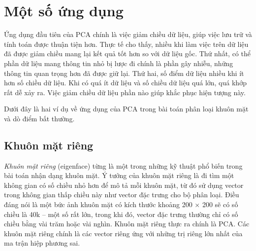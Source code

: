 





\section{Một số ứng dụng}
Ứng dụng đầu tiên của PCA chính là việc giảm chiều dữ liệu, giúp
việc lưu trữ và tính toán được thuận tiện hơn. Thực tế cho thấy, nhiều khi làm
việc trên dữ liệu đã được giảm chiều mang lại kết quả tốt hơn so với dữ liệu
gốc. Thứ nhất, có thể phần dữ liệu mang thông tin nhỏ bị lược đi chính là phần
gây nhiễu, những thông tin quan trọng hơn đã được giữ lại. Thứ hai, số điểm dữ
liệu nhiều khi ít hơn số chiều dữ liệu. Khi có quá ít dữ liệu và số chiều dữ
liệu quá lớn, quá khớp rất dễ xảy ra. Việc giảm chiều dữ liệu phần nào giúp
khắc phục hiện tượng này.

Dưới đây là hai ví dụ về ứng dụng của PCA trong bài toán phân loại khuôn mặt và dò điểm bất thường.

\subsection{Khuôn mặt riêng}
\textit{Khuôn mặt riêng} (eigenface) từng là một trong những kỹ thuật phổ biến
trong bài toán nhận dạng khuôn mặt. Ý tưởng của khuôn mặt riêng là đi tìm một
không gian có số chiều nhỏ hơn để mô tả mỗi khuôn mặt, từ đó sử dụng vector
trong không gian thấp chiều này như vector đặc trưng cho bộ phân loại. Điều đáng
nói là một bức ảnh khuôn mặt có kích thước khoảng 200 $\times$ 200 sẽ có số
chiều là 40k -- một số rất lớn, trong khi đó, vector đặc trưng thường chỉ có số
chiều bằng vài trăm hoặc vài nghìn. Khuôn mặt riêng thực ra chính là PCA. Các
khuôn mặt riêng chính là các vector riêng ứng với những trị riêng lớn nhất của
ma trận hiệp phương sai.

